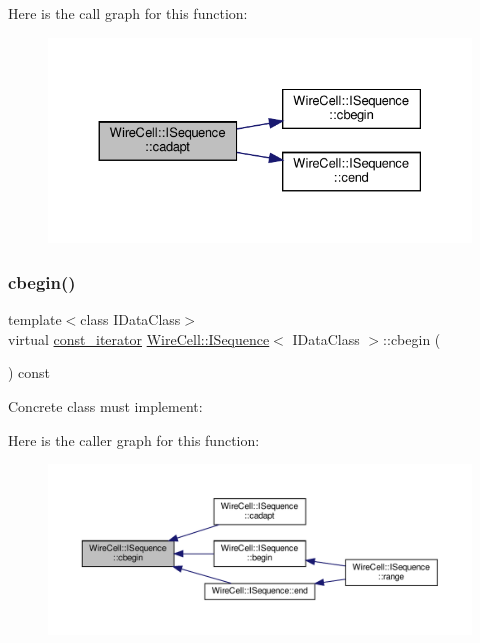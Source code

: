 Here is the call graph for this function\+:
\nopagebreak
\begin{figure}[H]
\begin{center}
\leavevmode
\includegraphics[width=330pt]{class_wire_cell_1_1_i_sequence_a14e5cb0b4dbac2c6aa82ee4734ce6b90_cgraph}
\end{center}
\end{figure}
\mbox{\label{class_wire_cell_1_1_i_sequence_a2d9cee960a7ae6081d5f5f1f94bdf7f9}} 
\subsubsection{\texorpdfstring{cbegin()}{cbegin()}}
{\footnotesize\ttfamily template$<$class I\+Data\+Class$>$ \\
virtual \hyperlink{class_wire_cell_1_1_i_sequence_a70e983c18db65df4337838592fa9fd9d}{const\+\_\+iterator} \hyperlink{class_wire_cell_1_1_i_sequence}{Wire\+Cell\+::\+I\+Sequence}$<$ I\+Data\+Class $>$\+::cbegin (\begin{DoxyParamCaption}{ }\end{DoxyParamCaption}) const\hspace{0.3cm}{\ttfamily [pure virtual]}}



Concrete class must implement\+: 

Here is the caller graph for this function\+:
\nopagebreak
\begin{figure}[H]
\begin{center}
\leavevmode
\includegraphics[width=350pt]{class_wire_cell_1_1_i_sequence_a2d9cee960a7ae6081d5f5f1f94bdf7f9_icgraph}
\end{center}
\end{figure}
\mbox{\label{class_wire_cell_1_1_i_sequence_a0707bb6db2b2cf79cbf7a6e3c05a7e14}} 
